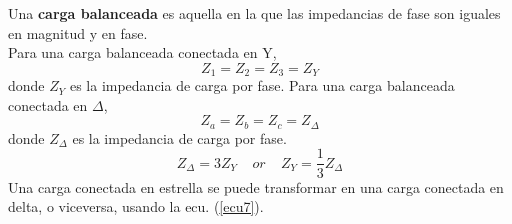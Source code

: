 \documentclass[twocolumn]{IEEEtran}
\begin{document}
\noindent
Una \textbf{carga balanceada} es aquella en la que las impedancias de fase son iguales en magnitud y en fase.\\
Para una carga balanceada conectada en Y,
\begin{equation}
 Z_1=Z_2=Z_3=Z_Y
\label{ecu5}
\end{equation}
\noindent
donde $Z_Y$ es la impedancia de carga por fase. Para una carga balanceada conectada en $\Delta$,
\begin{equation}
 Z_a=Z_b=Z_c=Z_{\Delta}
\label{ecu6}
\end{equation}
\noindent
donde $Z_{\Delta}$ es la impedancia de carga por fase.
\begin{equation}
 Z_{\Delta} =3 Z_{Y}\ \ \ \ \ or \ \ \ \ \ Z_{Y} =\frac{1}{3} Z_{\Delta}
\label{ecu7}
\end{equation}
\noindent
Una carga conectada en estrella se puede transformar en una carga conectada en delta, o viceversa, usando la ecu. (\ref{ecu7}).
\end{document}
